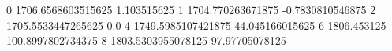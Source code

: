 0 1706.6568603515625 1.103515625
1 1704.770263671875 -0.7830810546875
2 1705.5533447265625 0.0
4 1749.5985107421875 44.045166015625
6 1806.453125 100.8997802734375
8 1803.5303955078125 97.97705078125
